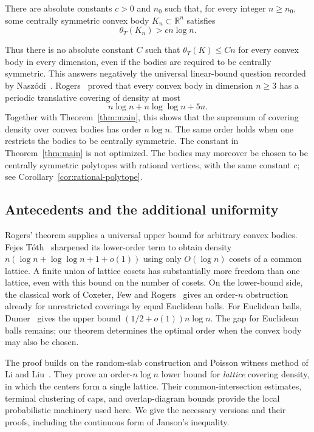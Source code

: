 \begin{theorem}\label{thm:main}
There are absolute constants $c>0$ and $n_0$ such that, for every integer
$n\ge n_0$, some centrally symmetric convex body $K_n\subset\mathbb R^n$
satisfies
\[
 \theta_T(K_n)>c n\log n.
\]
\end{theorem}

Thus there is no absolute constant $C$ such that
$\theta_T(K)\le Cn$ for every convex body in every dimension, even if the
bodies are required to be centrally symmetric. This answers negatively
the universal linear-bound question recorded by
Nasz\'odi~\cite[Section~3]{Naszodi2018Flavors}.
Rogers~\cite{Rogers1957Coverings} proved that every convex body in dimension
$n\ge3$ has a periodic translative covering of density at most
\begin{equation}\label{eq:rogers}
 n\log n+n\log\log n+5n.
\end{equation}
Together with Theorem~\ref{thm:main}, this shows that the supremum of
covering density over convex bodies has order $n\log n$. The same order holds when
one restricts the bodies to be centrally symmetric. The constant in
Theorem~\ref{thm:main} is not optimized.
The bodies may moreover be chosen to be centrally symmetric polytopes
with rational vertices, with the same constant $c$; see
Corollary~\ref{cor:rational-polytope}.

\subsection{Antecedents and the additional uniformity}

Rogers' theorem supplies a universal upper bound for arbitrary convex
bodies. Fejes T\'oth~\cite{FejesToth2009Covering} sharpened its lower-order
term to obtain density
$n(\log n+\log\log n+1+o(1))$ using only $O(\log n)$ cosets of a common
lattice. A finite union of lattice cosets has substantially more freedom
than one lattice, even with this bound on the number of cosets.
On the lower-bound side, the classical work of Coxeter, Few and
Rogers~\cite{CoxeterFewRogers1959Spheres} gives an order-$n$ obstruction
already for unrestricted coverings by equal Euclidean balls.
For Euclidean balls, Dumer~\cite[Corollary~2]{Dumer2007Spheres} gives the
upper bound $(1/2+o(1))n\log n$. The gap for Euclidean balls remains;
our theorem determines the optimal order when the convex body may also
be chosen.

The proof builds on the random-slab construction and Poisson witness method
of Li and Liu~\cite[Theorem~1.3]{LiLiu2026Lattice}. They prove an order-$n\log n$ lower bound
for \emph{lattice} covering density, in which the centers form a single
lattice. Their common-intersection estimates, terminal clustering of caps,
and overlap-diagram bounds provide the local probabilistic machinery used
here. We give the necessary versions and their proofs, including the
continuous form of Janson's inequality.

